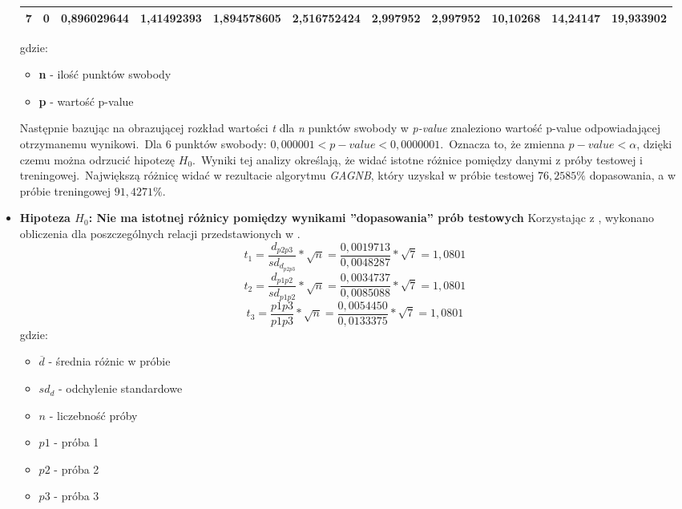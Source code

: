 \begin{itemize}
\begin{table}[H]
{\begin{tabular}{|c|l|l|l|l|l|l|l|l|l|l|}
            7 & 0 & 0,896029644 & 1,41492393 & 1,894578605 & 2,516752424 & 2,997952 & 2,997952 & 10,10268 & 14,24147 & 19,933902 \\ \hline
        \end{tabular}%
        }
        \label{tab:p-val}
    \end{table}
        gdzie:
        \begin{itemize}
            \item \textbf{n} - ilość punktów swobody
            \item \textbf{p} - wartość p-value
        \end{itemize}
    Następnie bazując na  obrazującej rozkład wartości \textit{t} dla \textit{n} punktów swobody w \textit{p-value} znaleziono wartość p-value odpowiadającej otrzymanemu wynikowi.\ Dla 6 punktów swobody: $0,000001 < p-value < 0,0000001$.\ Oznacza to, że zmienna $p-value < \alpha$, dzięki czemu można odrzucić hipotezę $H_0$.\ Wyniki tej analizy określają, że widać istotne różnice pomiędzy danymi z próby testowej i treningowej.\ Największą różnicę widać w rezultacie algorytmu \textit{GAGNB}, który uzyskał w próbie testowej $76,2585\%$ dopasowania, a w próbie treningowej $91,4271\%$.\\

    \item \textbf{Hipoteza $H_0$: Nie ma istotnej różnicy pomiędzy wynikami ''dopasowania'' prób testowych}
    Korzystając z , wykonano obliczenia dla poszczególnych relacji przedstawionych w .
    \begin{equation}
        \label{eq:t-p1}
        t_1 = \frac{d_{p2p3}}{sd_{d_{p2p3}}} * \sqrt{n} = \frac{0,0019713}{0,0048287} * \sqrt{7} = 1,0801
    \end{equation}
    \begin{equation}
        \label{eq:t-p2}
        t_2 = \frac{d_{p1p2}}{sd_{p1p2}} * \sqrt{n} = \frac{0,0034737}{0,0085088} * \sqrt{7} = 1,0801
    \end{equation}
    \begin{equation}
        \label{eq:t-p3}
        t_3 = \frac{p1p3}{p1p3} * \sqrt{n} = \frac{0,0054450}{0,0133375} * \sqrt{7} = 1,0801
    \end{equation}
    gdzie:
    \begin{itemize}
        \item $\overline{d}$ - średnia różnic w próbie
        \item $sd_d$ - odchylenie standardowe
        \item $n$ - liczebność próby
        \item $p1$ - próba 1
        \item $p2$ - próba 2
        \item $p3$ - próba 3
    \end{itemize}


\end{itemize}
